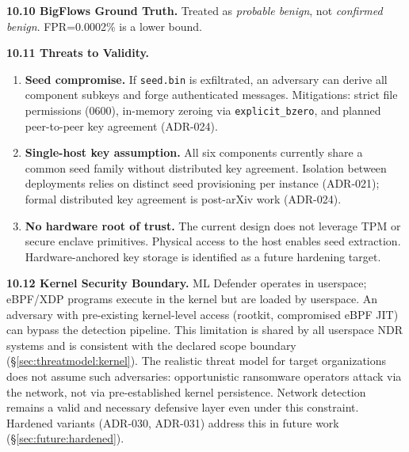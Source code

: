 \documentclass[11pt,a4paper]{article}
\begin{document}
    \textbf{10.10 BigFlows Ground Truth.} Treated as \emph{probable benign}, not
    \emph{confirmed benign}. FPR=0.0002\% is a lower bound.

    \textbf{10.11 Threats to Validity.}

    \begin{enumerate}
        \item \textbf{Seed compromise.} If \texttt{seed.bin} is exfiltrated, an adversary
        can derive all component subkeys and forge authenticated messages. Mitigations:
        strict file permissions (0600), in-memory zeroing via \texttt{explicit\_bzero},
        and planned peer-to-peer key agreement (ADR-024).

        \item \textbf{Single-host key assumption.} All six components currently share a
        common seed family without distributed key agreement. Isolation between deployments
        relies on distinct seed provisioning per instance (ADR-021); formal distributed key
        agreement is post-arXiv work (ADR-024).

        \item \textbf{No hardware root of trust.} The current design does not leverage TPM
        or secure enclave primitives. Physical access to the host enables seed extraction.
        Hardware-anchored key storage is identified as a future hardening target.

    \end{enumerate}

    \textbf{10.12 Kernel Security Boundary.} ML Defender operates in userspace; eBPF/XDP
    programs execute in the kernel but are loaded by userspace. An adversary with
    pre-existing kernel-level access (rootkit, compromised eBPF JIT) can bypass the
    detection pipeline. This limitation is shared by all userspace NDR systems and is
    consistent with the declared scope boundary (\S\ref{sec:threatmodel:kernel}).
    The realistic threat model for target organizations does not assume such adversaries:
    opportunistic ransomware operators attack via the network, not via pre-established
    kernel persistence. Network detection remains a valid and necessary defensive layer
    even under this constraint. Hardened variants (ADR-030, ADR-031) address this in
    future work (\S\ref{sec:future:hardened}).
\end{document}
